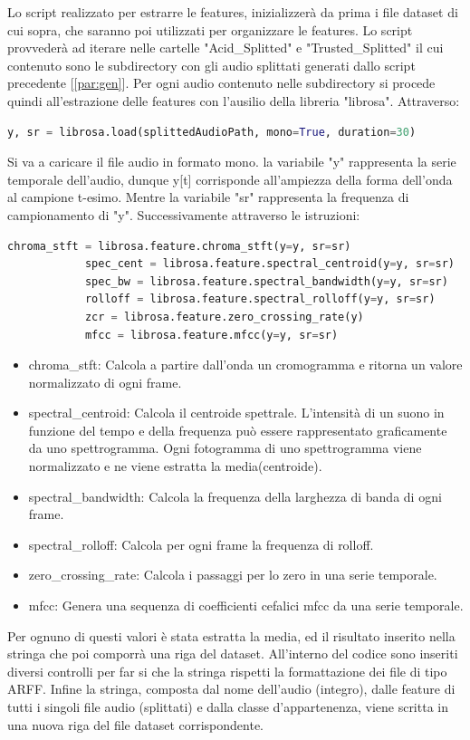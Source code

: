 Lo script realizzato per estrarre le features, inizializzerà da prima i file dataset di cui sopra, che saranno poi utilizzati per organizzare le features. Lo script provvederà ad iterare nelle cartelle "Acid\_Splitted" e "Trusted\_Splitted" il cui contenuto sono le subdirectory con gli audio splittati generati dallo script precedente [\ref{par:gen}]. Per ogni audio contenuto nelle subdirectory si procede quindi all'estrazione delle features con l'ausilio della libreria "librosa"\cite{libosa}.
Attraverso:
\begin{lstlisting}[language=Python]
 y, sr = librosa.load(splittedAudioPath, mono=True, duration=30)
\end{lstlisting}
Si va a caricare il file audio in formato mono. la variabile "y" rappresenta la serie temporale dell'audio, dunque y[t] corrisponde all'ampiezza della forma dell'onda al campione t-esimo. Mentre la variabile "sr" rappresenta la frequenza di campionamento di "y". 
Successivamente attraverso le istruzioni: 
\begin{lstlisting}[language=Python]
            chroma_stft = librosa.feature.chroma_stft(y=y, sr=sr)
            spec_cent = librosa.feature.spectral_centroid(y=y, sr=sr)
            spec_bw = librosa.feature.spectral_bandwidth(y=y, sr=sr)
            rolloff = librosa.feature.spectral_rolloff(y=y, sr=sr)
            zcr = librosa.feature.zero_crossing_rate(y)
            mfcc = librosa.feature.mfcc(y=y, sr=sr)
\end{lstlisting}
\begin{itemize}
\item chroma\_stft: Calcola a partire dall'onda un cromogramma e ritorna un valore normalizzato di ogni frame. 
\item spectral\_centroid: Calcola il centroide spettrale. L'intensità di un suono in funzione del tempo e della frequenza può essere rappresentato graficamente da uno spettrogramma. Ogni fotogramma di uno spettrogramma viene normalizzato e ne viene estratta la media(centroide).
\item spectral\_bandwidth: Calcola la frequenza della larghezza di banda di ogni frame.
\item spectral\_rolloff: Calcola per ogni frame la frequenza di rolloff.
\item zero\_crossing\_rate: Calcola i passaggi per lo zero in una serie temporale.
\item mfcc: Genera una sequenza di coefficienti cefalici mfcc da una serie temporale.
\end{itemize}
Per ognuno di questi valori è stata estratta la media, ed il risultato inserito nella stringa che poi comporrà una riga del dataset. All'interno del codice sono inseriti diversi controlli per far si che la stringa rispetti la formattazione dei file di tipo ARFF. Infine la stringa, composta dal nome dell'audio (integro), dalle feature di tutti i singoli file audio (splittati) e dalla classe d'appartenenza, viene scritta in una nuova riga del file dataset corrispondente. 

